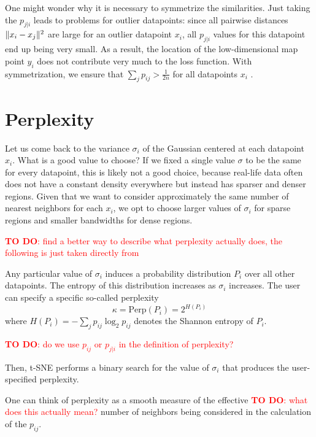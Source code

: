 One might wonder why it is necessary to symmetrize the similarities. 
Just taking the $p_{j|i}$ leads to problems for outlier datapoints: since all pairwise distances $\lVert x_i - x_j\rVert^2$ are large for an outlier datapoint $x_i$, all $p_{j|i}$ values for this datapoint end up being very small. 
As a result, the location of the low-dimensional map point $y_i$ does not contribute very much to the loss function. 
With symmetrization, we ensure that $\sum_{j} p_{ij} > \frac{1}{2n}$ for all datapoints $x_i$ \cite{vdMaa08}.  

\section{Perplexity}
Let us come back to the variance $\sigma_i$ of the Gaussian centered at each datapoint $x_i$. What is a good value to choose? 
If we fixed a single value $\sigma$ to be the same for every datapoint, this is likely not a good choice, because real-life data often does not have a constant density everywhere but instead has sparser and denser regions. 
Given that we want to consider approximately the same number of nearest neighbors for each $x_i$, we opt to choose larger values of $\sigma_i$ for sparse regions and smaller bandwidths for dense regions.

\textcolor{red}{\textbf{TO DO}: find a better way to describe what perplexity actually does, the following is just taken directly from \cite{vdMaa08}}

Any particular value of $\sigma_i$ induces a probability distribution $P_i$ over all other datapoints. 
The entropy of this distribution increases as $\sigma_i$ increases. 
The user can specify a specific so-called perplexity
\begin{equation}
    \kappa = \text{Perp}(P_i) = 2^{H(P_i)} 
\end{equation}
where $H(P_i) = -\sum_{j} p_{ij} \log_2 p_{ij}$ denotes the Shannon entropy of $P_i$. 

\textcolor{red}{\textbf{TO DO}: do we use $p_{ij}$ or $p_{j|i}$ in the definition of perplexity?}

Then, t-SNE performs a binary search for the value of $\sigma_i$ that produces the user-specified perplexity. 

One can think of perplexity as a smooth measure of the effective \textcolor{red}{\textbf{TO DO}: what does this actually mean?} number of neighbors being considered in the calculation of the $p_{ij}$. 

